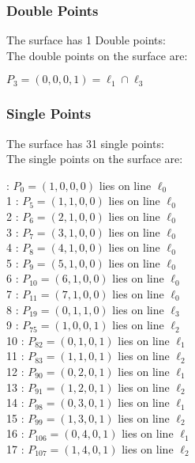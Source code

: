 \documentclass{article}
\begin{document}
{\subsubsection*{Double Points}
The surface has 1 Double points:\\
The double points on the surface are:\\
\begin{multicols}{2}
\noindent
$P_{3} = ( 0, 0, 0, 1 ) = \ell_{1} \cap \ell_{3} $\\
\end{multicols}
\subsubsection*{Single Points}
The surface has 31 single points:\\
The single points on the surface are:\\
\begin{multicols}{2}
 : $P_{0}=( 1, 0, 0, 0 )$ lies on line $\ell_{0}$\\
1 : $P_{5}=( 1, 1, 0, 0 )$ lies on line $\ell_{0}$\\
2 : $P_{6}=( 2, 1, 0, 0 )$ lies on line $\ell_{0}$\\
3 : $P_{7}=( 3, 1, 0, 0 )$ lies on line $\ell_{0}$\\
4 : $P_{8}=( 4, 1, 0, 0 )$ lies on line $\ell_{0}$\\
5 : $P_{9}=( 5, 1, 0, 0 )$ lies on line $\ell_{0}$\\
6 : $P_{10}=( 6, 1, 0, 0 )$ lies on line $\ell_{0}$\\
7 : $P_{11}=( 7, 1, 0, 0 )$ lies on line $\ell_{0}$\\
8 : $P_{19}=( 0, 1, 1, 0 )$ lies on line $\ell_{3}$\\
9 : $P_{75}=( 1, 0, 0, 1 )$ lies on line $\ell_{2}$\\
10 : $P_{82}=( 0, 1, 0, 1 )$ lies on line $\ell_{1}$\\
11 : $P_{83}=( 1, 1, 0, 1 )$ lies on line $\ell_{2}$\\
12 : $P_{90}=( 0, 2, 0, 1 )$ lies on line $\ell_{1}$\\
13 : $P_{91}=( 1, 2, 0, 1 )$ lies on line $\ell_{2}$\\
14 : $P_{98}=( 0, 3, 0, 1 )$ lies on line $\ell_{1}$\\
15 : $P_{99}=( 1, 3, 0, 1 )$ lies on line $\ell_{2}$\\
16 : $P_{106}=( 0, 4, 0, 1 )$ lies on line $\ell_{1}$\\
17 : $P_{107}=( 1, 4, 0, 1 )$ lies on line $\ell_{2}$\\

\end{multicols}}
\end{document}
